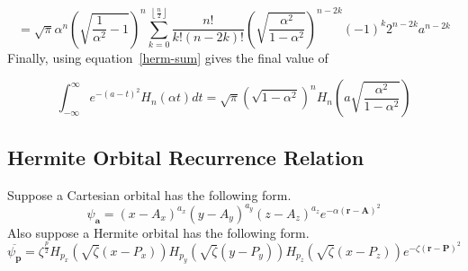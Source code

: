 \documentclass[twoside,10pt,draft]{article}
\begin{document}
\begin{equation}
  = \sqrt{\pi} \alpha^n \left(\sqrt{\frac{1}{\alpha^2} - 1}\right)^n \sum_{k = 0}^{\left\lfloor\frac{n}{2}\right\rfloor} \frac{n!}{k!(n - 2k)!}\left(\sqrt{\frac{\alpha^2}{1 - \alpha^2}}\right)^{n - 2k} (-1)^k 2^{n - 2k} a^{n - 2k}
  \label{herm-rearranged}
\end{equation}
Finally, using equation~\ref{herm-sum} gives the final value of

\begin{equation}
  \int_{-\infty}^\infty e^{-(a - t)^2} H_n(\alpha t) dt = \sqrt{\pi}\left(\sqrt{1 - \alpha^2}\right)^n H_n\left(a\sqrt{\frac{\alpha^2}{1 - \alpha^2}}\right)
  \label{herm-int-solved}
\end{equation}
  

\subsection{Hermite Orbital Recurrence Relation}

Suppose a Cartesian orbital has the following form.
\begin{equation}
  \psi_{\mathbf{a}} = \left(x - A_x\right)^{a_x}\left(y - A_y\right)^{a_y}\left(z - A_z\right)^{a_z}e^{-\alpha\left(\mathbf{r} - \mathbf{A}\right)^2}
\end{equation}
Also suppose a Hermite orbital has the following form.
\begin{equation}
  \overline{\psi_{\mathbf{p}}} = \zeta^{\frac{p}{2}} H_{p_x}\left(\sqrt{\zeta} \left(x - P_x\right)\right) H_{p_y}\left(\sqrt{\zeta} \left(y - P_y\right)\right)H_{p_z}\left(\sqrt{\zeta} \left(x - P_z\right)\right) e^{-\zeta\left(\mathbf{r} - \mathbf{P}\right)^2}
\end{equation}
\end{document}
